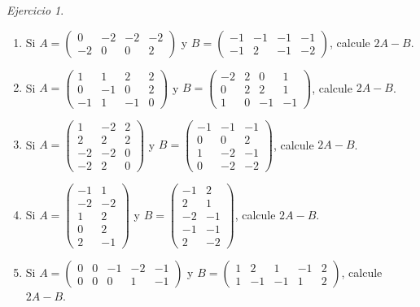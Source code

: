 \documentclass[12pt]{article}
\theoremstyle{remark}
\newtheorem{Ejer}[definicion]{Ejercicio}
\begin{document}
\begin{Ejer}
\begin{enumerate}[resume=banco]
\item Si $A=\begin{pmatrix}0&-2&-2&-2\\-2&0&0&2\end{pmatrix}$ y $B=\begin{pmatrix}-1&-1&-1&-1\\-1&2&-1&-2\end{pmatrix}$, calcule $2A-B$.

\item Si $A=\begin{pmatrix}1&1&2&2\\0&-1&0&2\\-1&1&-1&0\end{pmatrix}$ y $B=\begin{pmatrix}-2&2&0&1\\0&2&2&1\\1&0&-1&-1\end{pmatrix}$, calcule $2A-B$.

\item Si $A=\begin{pmatrix}1&-2&2\\2&2&2\\-2&-2&0\\-2&2&0\end{pmatrix}$ y $B=\begin{pmatrix}-1&-1&-1\\0&0&2\\1&-2&-1\\0&-2&-2\end{pmatrix}$, calcule $2A-B$.

\item Si $A=\begin{pmatrix}-1&1\\-2&-2\\1&2\\0&2\\2&-1\end{pmatrix}$ y $B=\begin{pmatrix}-1&2\\2&1\\-2&-1\\-1&-1\\2&-2\end{pmatrix}$, calcule $2A-B$.

\item Si $A=\begin{pmatrix}0&0&-1&-2&-1\\0&0&0&1&-1\end{pmatrix}$ y $B=\begin{pmatrix}1&2&1&-1&2\\1&-1&-1&1&2\end{pmatrix}$, calcule $2A-B$.


\end{enumerate}
\end{Ejer}
\end{document}
